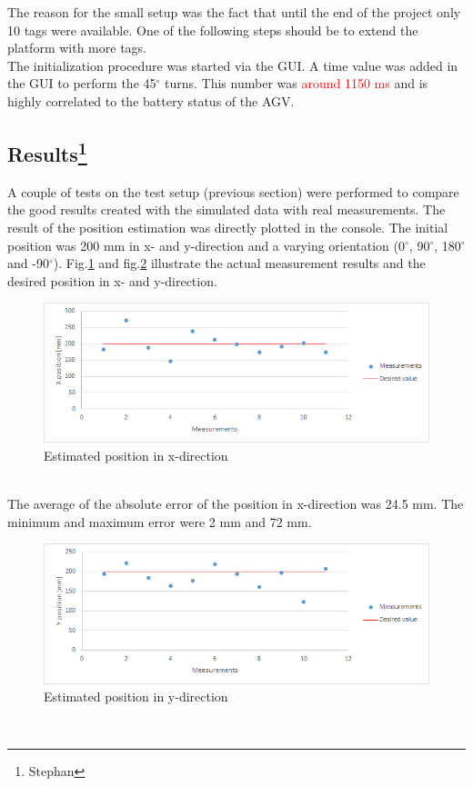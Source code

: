 The reason for the small setup was the fact that until the end of the project only 10 tags were available. One of the following steps should be to extend the platform with more tags.\\
The initialization procedure was started via the GUI. A time value was added in the GUI to perform the 45$^\circ$ turns. This number was \textcolor{red}{around 1150 ms} and is highly correlated to the battery status of the AGV.\\

\subsection[Results]{Results\footnote{Stephan}}
A couple of tests on the test setup (previous section) were performed to compare the good results created with the simulated data with real measurements. The result of the position estimation was directly plotted in the console. The initial position was 200 mm in x- and y-direction and a varying orientation (0$^\circ$, 90$^\circ$, 180$^\circ$ and -90$^\circ$). Fig.\ref{ResultX} and fig.\ref{ResultY} illustrate the actual measurement results and the desired position in x- and y-direction. 
\begin{figure}[!htbp]
\centering
\includegraphics[width = 14cm]{Pictures/ResultX}
\caption{Estimated position in x-direction}
\label{ResultX}
\end{figure}\\
The average of the absolute error of the position in x-direction was 24.5 mm. The minimum and maximum error were 2 mm and 72 mm.\\
\begin{figure}[!htbp]
\centering
\includegraphics[width = 14cm]{Pictures/ResultY}
\caption{Estimated position in y-direction}
\label{ResultY}
\end{figure}\\
